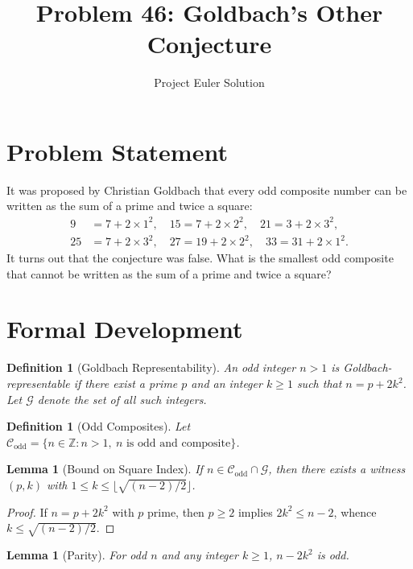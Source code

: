 \documentclass[12pt]{article}
\title{Problem 46: Goldbach's Other Conjecture}
\author{Project Euler Solution}
\date{}
\newtheorem{lemma}[theorem]{Lemma}
\newtheorem{definition}[theorem]{Definition}
\begin{document}
\maketitle

\section{Problem Statement}

It was proposed by Christian Goldbach that every odd composite number can be written as the sum of a prime and twice a square:
\begin{align*}
9 &= 7 + 2 \times 1^2, \quad 15 = 7 + 2 \times 2^2, \quad 21 = 3 + 2 \times 3^2, \\
25 &= 7 + 2 \times 3^2, \quad 27 = 19 + 2 \times 2^2, \quad 33 = 31 + 2 \times 1^2.
\end{align*}
It turns out that the conjecture was false. What is the smallest odd composite that cannot be written as the sum of a prime and twice a square?

\section{Formal Development}

\begin{definition}[Goldbach Representability]
An odd integer $n > 1$ is \emph{Goldbach-representable} if there exist a prime $p$ and an integer $k \geq 1$ such that $n = p + 2k^2$. Let $\mathcal{G}$ denote the set of all such integers.
\end{definition}

\begin{definition}[Odd Composites]
Let $\mathcal{C}_{\mathrm{odd}} = \{n \in \mathbb{Z} : n > 1,\ n \text{ is odd and composite}\}$.
\end{definition}

\begin{lemma}[Bound on Square Index]\label{lem:bound}
If $n \in \mathcal{C}_{\mathrm{odd}} \cap \mathcal{G}$, then there exists a witness $(p,k)$ with $1 \leq k \leq \lfloor\sqrt{(n-2)/2}\rfloor$.
\end{lemma}

\begin{proof}
If $n = p + 2k^2$ with $p$ prime, then $p \geq 2$ implies $2k^2 \leq n - 2$, whence $k \leq \sqrt{(n-2)/2}$.
\end{proof}

\begin{lemma}[Parity]\label{lem:parity}
For odd $n$ and any integer $k \geq 1$, $n - 2k^2$ is odd.
\end{lemma}
\end{document}
